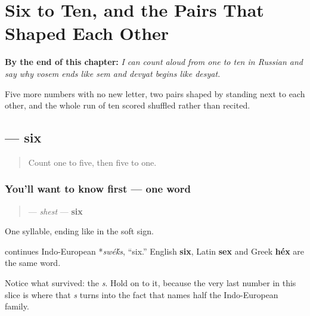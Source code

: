 
\chapter{Six to Ten, and the Pairs That Shaped Each Other}
\label{ch:ru-count-ten}

\begin{chapteropening}
\textbf{By the end of this chapter:} \emph{I can count aloud from one to ten in Russian and say why vosem ends like sem and devyat begins like desyat.}

Five more numbers with no new letter, two pairs shaped by standing next to each other, and the whole run of ten scored shuffled rather than recited.
\end{chapteropening}

\section[\texorpdfstring{\ru{шесть} (shest)}{шесть (shest)}]{ — six}

\label{lesson:RU-C24-shest}



\begin{quote}
Count one to five, then five to one.
\end{quote}

\subsection*{You'll want to know first — one word}
\begin{quote}
\textbf{} — \emph{shest} — \textbf{six}
\end{quote}

One syllable, ending like \textbf{} in the soft sign.

\begin{cousinweb}
\textbf{} continues Indo-European *\emph{swé\'{k}s}, \textquotedblleft{}six.\textquotedblright{} English \textbf{six}, Latin \textbf{sex} and Greek \textbf{héx} are the same word.

Notice what survived: the \emph{s}. Hold on to it, because the very last number in this slice is where that \emph{s} turns into the fact that names half the Indo-European family.
\end{cousinweb}

